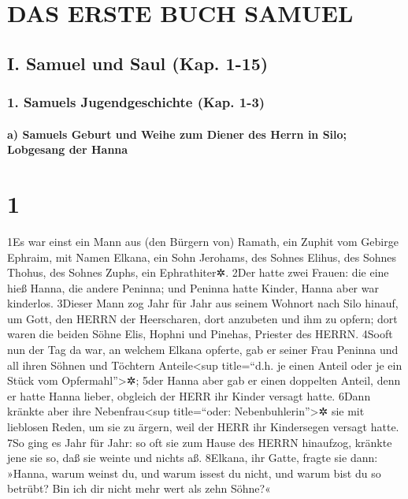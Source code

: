 \hypertarget{das-erste-buch-samuel}{%
\section{DAS ERSTE BUCH SAMUEL}\label{das-erste-buch-samuel}}

\hypertarget{i.-samuel-und-saul-kap.-1-15}{%
\subsection{I. Samuel und Saul (Kap.
1-15)}\label{i.-samuel-und-saul-kap.-1-15}}

\hypertarget{samuels-jugendgeschichte-kap.-1-3}{%
\subsubsection{1. Samuels Jugendgeschichte (Kap.
1-3)}\label{samuels-jugendgeschichte-kap.-1-3}}

\hypertarget{a-samuels-geburt-und-weihe-zum-diener-des-herrn-in-silo-lobgesang-der-hanna}{%
\paragraph{a) Samuels Geburt und Weihe zum Diener des Herrn in Silo;
Lobgesang der
Hanna}\label{a-samuels-geburt-und-weihe-zum-diener-des-herrn-in-silo-lobgesang-der-hanna}}

\hypertarget{section}{%
\section{1}\label{section}}

1Es war einst ein Mann aus (den Bürgern von) Ramath, ein Zuphit vom
Gebirge Ephraim, mit Namen Elkana, ein Sohn Jerohams, des Sohnes Elihus,
des Sohnes Thohus, des Sohnes Zuphs, ein Ephrathiter✲. 2Der hatte zwei
Frauen: die eine hieß Hanna, die andere Peninna; und Peninna hatte
Kinder, Hanna aber war kinderlos. 3Dieser Mann zog Jahr für Jahr aus
seinem Wohnort nach Silo hinauf, um Gott, den HERRN der Heerscharen,
dort anzubeten und ihm zu opfern; dort waren die beiden Söhne Elis,
Hophni und Pinehas, Priester des HERRN. 4Sooft nun der Tag da war, an
welchem Elkana opferte, gab er seiner Frau Peninna und all ihren Söhnen
und Töchtern Anteile\textless sup title=``d.h. je einen Anteil oder je
ein Stück vom Opfermahl''\textgreater✲; 5der Hanna aber gab er einen
doppelten Anteil, denn er hatte Hanna lieber, obgleich der HERR ihr
Kinder versagt hatte. 6Dann kränkte aber ihre Nebenfrau\textless sup
title=``oder: Nebenbuhlerin''\textgreater✲ sie mit lieblosen Reden, um
sie zu ärgern, weil der HERR ihr Kindersegen versagt hatte. 7So ging es
Jahr für Jahr: so oft sie zum Hause des HERRN hinaufzog, kränkte jene
sie so, daß sie weinte und nichts aß. 8Elkana, ihr Gatte, fragte sie
dann: »Hanna, warum weinst du, und warum issest du nicht, und warum bist
du so betrübt? Bin ich dir nicht mehr wert als zehn Söhne?«

